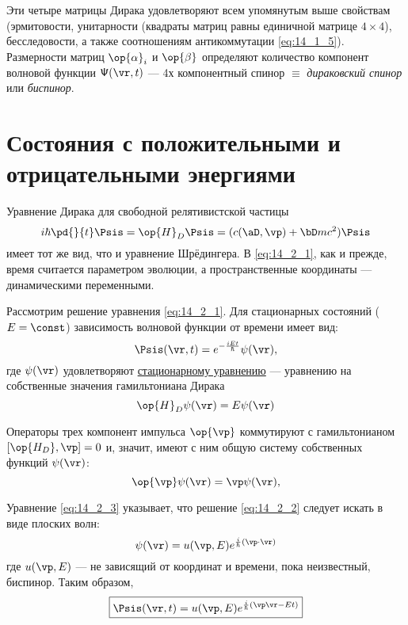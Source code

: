 Эти четыре матрицы Дирака удовлетворяют всем упомянутым выше свойствам (эрмитовости, унитарности (квадраты матриц равны единичной матрице $4 \times 4$), бесследовости, а также соотношениям антикоммутации \eqref{eq:14_1_5}). Размерности матриц $\op{\alpha}_i$ и $\op{\beta}$ определяют количество компонент волновой функции $\mathsf{\Psi}(\vr, t)$ --- 4х компонентный спинор $\equiv$ {\em дираковский спинор} или {\em биспинор}.

\section{Состояния с положительными и отрицательными энергиями}

Уравнение Дирака для свободной релятивистской частицы 
\begin{equation}
\label{eq:14_2_1}
i \hbar \pd{}{t} \Psis = \op{H}_D \Psis = (c(\aD, \vp) + \bD mc^2) \Psis
\end{equation}
имеет тот же вид, что и уравнение Шрёдингера. В \eqref{eq:14_2_1}, как и прежде, время считается параметром эволюции, а пространственные координаты --- динамическими переменными.

Рассмотрим решение уравнения \eqref{eq:14_2_1}. Для стационарных состояний ($E = \const$) зависимость волновой функции от времени имеет вид:
$$
\Psis(\vr, t) = e^{-\frac{i Et}{\hbar}} \psi(\vr),
$$
где $\psi(\vr)$ удовлетворяют \underline{стационарному уравнению} --- уравнению на собственные значения гамильтониана Дирака
\begin{equation}
\label{eq:14_2_2}
\op{H}_D \psi(\vr) = E \psi(\vr)
\end{equation}

Операторы трех компонент импульса $\op{\vp}$ коммутируют с гамильтонианом $[\op{H_D}, \vp] = 0$ и, значит, имеют с ним общую систему собственных функций $\psi(\vr)$:
\begin{equation}
\label{eq:14_2_3}
\op{\vp} \psi(\vr) = \vp \psi(\vr),
\end{equation}

Уравнение \eqref{eq:14_2_3} указывает, что решение \eqref{eq:14_2_2} следует искать в виде плоских волн:
\begin{equation}
\label{eq:14_2_4}
\psi(\vr) = u(\vp, E) e^{\frac{i}{\hbar}(\vp \cdot \vr)}
\end{equation}
где $u(\vp, E)$ --- не зависящий от координат и времени, пока неизвестный, биспинор. Таким образом,
$$
\boxed{\Psis(\vr, t) = u(\vp, E) e^{\frac{i}{\hbar}(\vp \vr - Et)}}
$$

